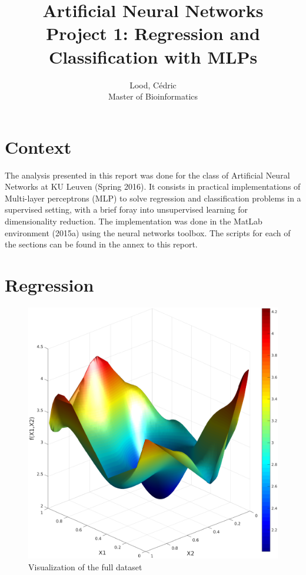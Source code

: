 \documentclass[11pt, a4paper]{article}
\title{ \huge Artificial Neural Networks \\ 
  { \large Project 1: Regression and Classification with MLPs }}
\author{
        Lood, Cédric \\
        \small Master of Bioinformatics
}
\begin{document}
\maketitle

\section{Context}

The analysis presented in this report was done for the class of
Artificial Neural Networks at KU Leuven (Spring 2016). It consists in
practical implementations of Multi-layer perceptrons (MLP) to solve
regression and classification problems in a supervised setting, with a
brief foray into unsupervised learning for dimensionality
reduction. The implementation was done in the MatLab environment
(2015a) using the neural networks toolbox. The scripts for each of the
sections can be found in the annex to this report.

\section{Regression}

\begin{figure}
  \vspace{-20pt}
  \centering
  \includegraphics[scale=.35]{regression_dataset.pdf}
  \caption{Visualization of the full dataset}
  \label{fig:regression_dataset}
\end{figure}
\end{document}
